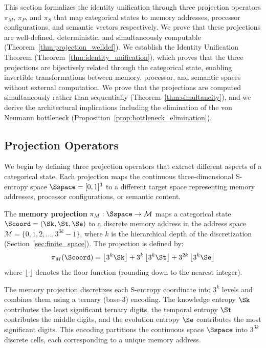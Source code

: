 This section formalizes the identity unification through three projection operators $\pi_M$, $\pi_P$, and $\pi_S$ that map categorical states to memory addresses, processor configurations, and semantic vectors respectively. We prove that these projections are well-defined, deterministic, and simultaneously computable (Theorem~\ref{thm:projection_welldef}). We establish the Identity Unification Theorem (Theorem~\ref{thm:identity_unification}), which proves that the three projections are bijectively related through the categorical state, enabling invertible transformations between memory, processor, and semantic spaces without external computation. We prove that the projections are computed simultaneously rather than sequentially (Theorem~\ref{thm:simultaneity}), and we derive the architectural implications including the elimination of the von Neumann bottleneck (Proposition~\ref{prop:bottleneck_elimination}).

\subsection{Projection Operators}

We begin by defining three projection operators that extract different aspects of a categorical state. Each projection maps the continuous three-dimensional S-entropy space $\Sspace = [0,1]^3$ to a different target space representing memory addresses, processor configurations, or semantic content.

\begin{definition}
\label{def:memory_projection}
The \textbf{memory projection} $\pi_M: \Sspace \to \mathcal{M}$ maps a categorical state $\Scoord = (\Sk, \St, \Se)$ to a discrete memory address in the address space $\mathcal{M} = \{0, 1, 2, \ldots, 3^{3k} - 1\}$, where $k$ is the hierarchical depth of the discretization (Section~\ref{sec:finite_space}). The projection is defined by:
\begin{equation}
\pi_M(\Scoord) = \left\lfloor 3^k \Sk \right\rfloor + 3^k \left\lfloor 3^k \St \right\rfloor + 3^{2k} \left\lfloor 3^k \Se \right\rfloor
\label{eq:memory_projection}
\end{equation}
where $\lfloor \cdot \rfloor$ denotes the floor function (rounding down to the nearest integer).
\end{definition}

The memory projection discretizes each S-entropy coordinate into $3^k$ levels and combines them using a ternary (base-3) encoding. The knowledge entropy $\Sk$ contributes the least significant ternary digits, the temporal entropy $\St$ contributes the middle digits, and the evolution entropy $\Se$ contributes the most significant digits. This encoding partitions the continuous space $\Sspace$ into $3^{3k}$ discrete cells, each corresponding to a unique memory address.

